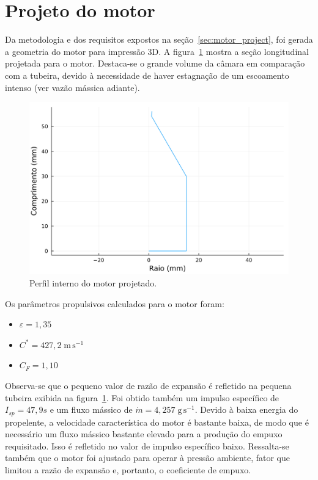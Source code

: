 
\section{Projeto do motor}

Da metodologia e dos requisitos expostos na seção~\ref{sec:motor_project}, foi gerada a geometria do motor para impressão 3D. A figura~\ref{fig:internal_profile} mostra a seção longitudinal projetada para o motor. Destaca-se o grande volume da câmara em comparação com a tubeira, devido à necessidade de haver estagnação de um escoamento intenso (ver vazão mássica adiante).

\begin{figure}[htbp]
    \centering
    \includegraphics[width=\textwidth]{img/internal_profile.png}
    \caption{Perfil interno do motor projetado.}\label{fig:internal_profile}
\end{figure}

Os parâmetros propulsivos calculados para o motor foram:
\begin{itemize}
    \item \( \varepsilon = 1,35 \)
    \item \(C^* = 427,2\;\mathrm{m}\,\mathrm{s}^{-1}\)
    \item \(C_{F} = 1,10\)
\end{itemize}

Observa-se que o pequeno valor de razão de expansão é refletido na pequena tubeira exibida na figura~\ref{fig:internal_profile}. Foi obtido também um impulso específico de \(I_{sp} = 47,9s\) e um fluxo mássico de \(\dot{m} = 4,257\;\mathrm{g}\,\mathrm{s}^{-1}\). Devido à baixa energia do propelente, a velocidade característica do motor é bastante baixa, de modo que é necessário um fluxo mássico bastante elevado para a produção do empuxo requisitado. Isso é refletido no valor de impulso específico baixo. Ressalta-se também que o motor foi ajustado para operar à pressão ambiente, fator que limitou a razão de expansão e, portanto, o coeficiente de empuxo. 


